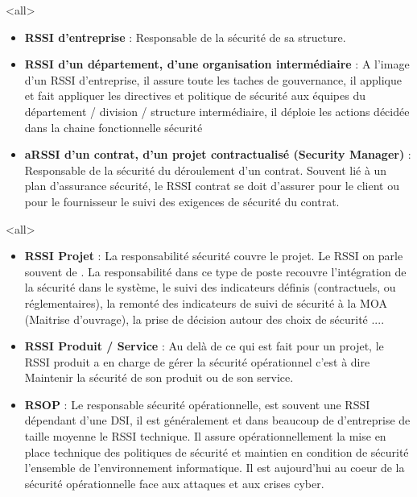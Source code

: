 \mode<all>{ 
{
\begin{itemize}
\item \textbf{RSSI d'entreprise} : Responsable de la sécurité de sa structure.
\item  \textbf{RSSI d'un département, d'une organisation intermédiaire} : A l'image d'un RSSI d'entreprise, il assure toute les taches de gouvernance, il applique et fait appliquer les directives et politique de sécurité aux équipes du département / division / structure intermédiaire, il déploie les actions décidée dans la chaine fonctionnelle sécurité
\item   \textbf{\gls{aRSSI} d'un contrat, d'un projet contractualisé (Security Manager)} : Responsable de la sécurité du  déroulement d'un contrat. Souvent lié à un plan d'assurance sécurité, le RSSI contrat se doit d'assurer pour le client ou pour le fournisseur le suivi des exigences de sécurité du contrat.
\end{itemize}
}} %


\mode<all>{
{\begin{itemize}
	\item \textbf{RSSI Projet} : La responsabilité sécurité couvre le projet. Le RSSI on parle souvent de . La responsabilité dans ce type de poste recouvre l'intégration de la sécurité dans le système, le suivi des indicateurs définis (contractuels, ou réglementaires), la remonté des indicateurs de suivi de sécurité à la MOA (Maitrise d'ouvrage), la prise de décision autour des choix de sécurité ....
	\item \textbf{RSSI Produit / Service} : Au delà de ce qui est fait pour un projet, le RSSI produit a en charge de gérer la sécurité opérationnel c'est à dire Maintenir la sécurité de son produit ou de son service.
 \item \textbf{RSOP} : Le responsable sécurité opérationnelle, est souvent une RSSI dépendant d'une DSI, il est généralement et dans beaucoup de d'entreprise de taille moyenne le RSSI technique. Il assure opérationnellement la mise en place technique des politiques de sécurité et maintien en condition de sécurité l'ensemble de l'environnement informatique. Il est aujourd'hui au coeur de la sécurité opérationnelle face aux attaques et aux crises cyber.
\end{itemize}
}} %


